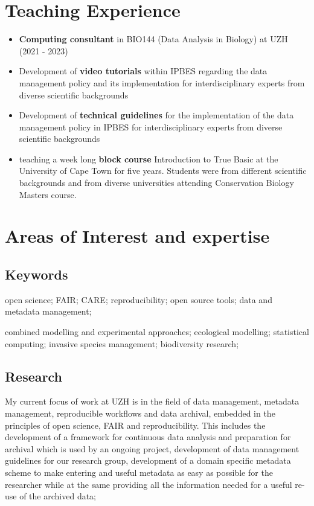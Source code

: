 \documentclass[a4paper]{article}
\begin{document}
\section{Teaching Experience}

\begin{itemize}[leftmargin=1.1in]

\item \textbf{Computing consultant} in BIO144 (Data Analysis in
	Biology) at UZH (2021 - 2023)

\item Development of \textbf{video tutorials} within IPBES regarding
	the data management policy and its implementation for
	interdisciplinary experts from diverse scientific backgrounds

\item Development of \textbf{technical guidelines} for the
	implementation of the data management policy in IPBES for
	interdisciplinary experts from diverse scientific backgrounds

\item teaching a week long \textbf{block course} Introduction to True
	Basic at the University of Cape Town for five years. Students were
	from different scientific backgrounds and from diverse universities
	attending Conservation Biology Masters course.


\end{itemize}

\section{Areas of Interest and expertise}

\subsection{Keywords}

    open science; FAIR; CARE; reproducibility; 
    open source tools; 
    data and metadata management; 
    
    combined modelling and experimental approaches;
    ecological modelling; statistical computing; 
	  invasive species management; biodiversity research;

\subsection{Research}


My current focus of work at UZH is in the field of data management,
	metadata management, reproducible workflows and data archival,
	embedded in the principles of open science, FAIR and reproducibility.
	This includes the development of a framework for continuous data
	analysis and preparation for archival which is used by an ongoing
	project, development of data management guidelines for our research
	group, development of a domain specific metadata scheme to make
	entering and useful metadata as easy as possible for the researcher
	while at the same providing all the information needed for a useful
	re-use of the archived data;
\end{document}
